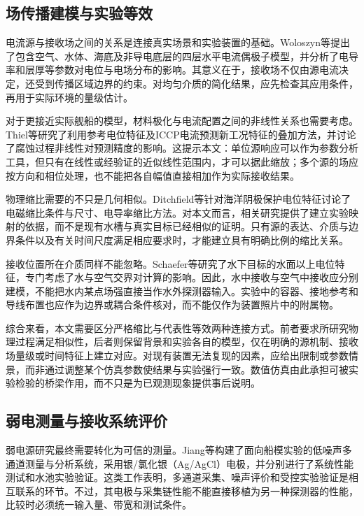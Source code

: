 \subsection{场传播建模与实验等效}

电流源与接收场之间的关系是连接真实场景和实验装置的基础。Woloszyn等提出了包含空气、水体、海底及非导电底层的四层水平电流偶极子模型，并分析了电导率和层厚等参数对电位与电场分布的影响\cite{woloszyn2022}。其意义在于，接收场不仅由源电流决定，还受到传播区域边界的约束。对均匀介质的简化结果，应先检查其应用条件，再用于实际环境的量级估计。

对于更接近实际舰船的模型，材料极化与电流配置之间的非线性关系也需要考虑。Thiel等研究了利用参考电位特征及ICCP电流预测新工况特征的叠加方法，并讨论了腐蚀过程非线性对预测精度的影响\cite{thiel2020}。这提示本文：单位源响应可以作为参数分析工具，但只有在线性或经验证的近似线性范围内，才可以据此缩放；多个源的场应按方向和相位处理，也不能把各自幅值直接相加作为实际接收结果。

物理缩比需要的不只是几何相似。Ditchfield等针对海洋阴极保护电位特征讨论了电磁缩比条件与尺寸、电导率缩比方法\cite{ditchfield1995}。对本文而言，相关研究提供了建立实验映射的依据，而不是现有水槽与真实目标已经相似的证明。只有源的表达、介质与边界条件以及有关时间尺度满足相应要求时，才能建立具有明确比例的缩比关系。

接收位置所在介质同样不能忽略。Schaefer等研究了水下目标的水面以上电位特征，专门考虑了水与空气交界对计算的影响\cite{schaefer2019}。因此，水中接收与空气中接收应分别建模，不能把水内某点场强直接当作水外探测器输入。实验中的容器、接地参考和导线布置也应作为边界或耦合条件核对，而不能仅作为装置照片中的附属物。

综合来看，本文需要区分严格缩比与代表性等效两种连接方式。前者要求所研究物理过程满足相似性，后者则保留背景和实验各自的模型，仅在明确的源机制、接收场量级或时间特征上建立对应。对现有装置无法复现的因素，应给出限制或参数情景，而非通过调整某个仿真参数使结果与实验强行一致。数值仿真由此承担可被实验检验的桥梁作用，而不只是为已观测现象提供事后说明。

\subsection{弱电测量与接收系统评价}

弱电源研究最终需要转化为可信的测量。Jiang等构建了面向船模实验的低噪声多通道测量与分析系统，采用银/氯化银（Ag/AgCl）电极，并分别进行了系统性能测试和水池实验验证\cite{jiang2024}。这类工作表明，多通道采集、噪声评价和受控实验验证是相互联系的环节。不过，其电极与采集链性能不能直接移植为另一种探测器的性能，比较时必须统一输入量、带宽和测试条件。

